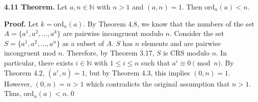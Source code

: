 \documentclass[12pt]{article}
\begin{document}
\noindent\textbf{4.11 Theorem.} Let $a,n\in\mathbb{N}$ with $n>1$ and $(a,n)=1$. Then $\text{ord}_n(a)<n$.

\bigskip

\noindent\textbf{Proof.} Let $k=\text{ord}_n(a)$. By Theorem 4.8, we know that the numbers of the set $A=\{a^1,a^2,...,a^k\}$ are pairwise incongruent modulo $n$. Consider the set $S=\{ a^1,a^2,...,a^n\}$ as a subset of $A$. $S$ has $n$ elements and are pairwise incongruent mod $n$. Therefore, by Theorem 3.17, $S$ is CRS modulo $n$. In particular, there exists $i\in\mathbb{N}$ with $1\leq i\leq n$ such that $a^i\equiv 0\pmod n$. By Theorem 4.2, $(a^i,n)=1$, but by Theorem 4.3, this implies $(0,n)=1$. However, $(0,n)=n>1$ which contradicts the original assumption that $n>1$. Thus, $\text{ord}_n(a)<n$.\qed
\end{document}

